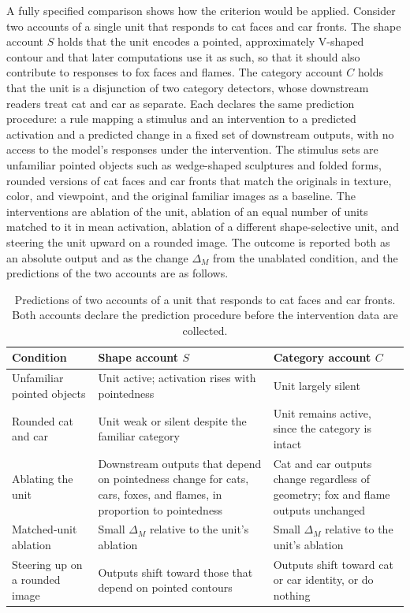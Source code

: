 \documentclass[11pt]{article}
\begin{document}
A fully specified comparison shows how the criterion would be applied. Consider two accounts of a single unit that responds to cat faces and car fronts. The shape account $S$ holds that the unit encodes a pointed, approximately V-shaped contour and that later computations use it as such, so that it should also contribute to responses to fox faces and flames. The category account $C$ holds that the unit is a disjunction of two category detectors, whose downstream readers treat cat and car as separate. Each declares the same prediction procedure: a rule mapping a stimulus and an intervention to a predicted activation and a predicted change in a fixed set of downstream outputs, with no access to the model's responses under the intervention. The stimulus sets are unfamiliar pointed objects such as wedge-shaped sculptures and folded forms, rounded versions of cat faces and car fronts that match the originals in texture, color, and viewpoint, and the original familiar images as a baseline. The interventions are ablation of the unit, ablation of an equal number of units matched to it in mean activation, ablation of a different shape-selective unit, and steering the unit upward on a rounded image. The outcome is reported both as an absolute output and as the change $\Delta_M$ from the unablated condition, and the predictions of the two accounts are as follows.

\begin{table}[h]
\centering\small
\begin{tabular}{@{}p{}p{}p{}@{}}
\toprule
Condition & Shape account $S$ & Category account $C$ \\
\midrule
Unfamiliar pointed objects & Unit active; activation rises with pointedness & Unit largely silent \\
Rounded cat and car & Unit weak or silent despite the familiar category & Unit remains active, since the category is intact \\
Ablating the unit & Downstream outputs that depend on pointedness change for cats, cars, foxes, and flames, in proportion to pointedness & Cat and car outputs change regardless of geometry; fox and flame outputs unchanged \\
Matched-unit ablation & Small $\Delta_M$ relative to the unit's ablation & Small $\Delta_M$ relative to the unit's ablation \\
Steering up on a rounded image & Outputs shift toward those that depend on pointed contours & Outputs shift toward cat or car identity, or do nothing \\
\bottomrule
\end{tabular}
\caption{Predictions of two accounts of a unit that responds to cat faces and car fronts. Both accounts declare the prediction procedure before the intervention data are collected.}
\end{table}
\end{document}
